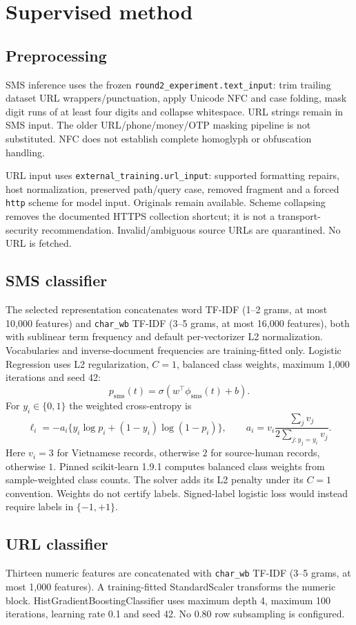 \documentclass[11pt]{article}
\begin{document}
\section{Supervised method}
\subsection{Preprocessing}
SMS inference uses the frozen \texttt{round2\_experiment.text\_input}: trim
trailing dataset URL wrappers/punctuation, apply Unicode NFC and case folding,
mask digit runs of at least four digits and collapse whitespace. URL strings remain
in SMS input. The older URL/phone/money/OTP masking pipeline is not substituted.
NFC does not establish complete homoglyph or obfuscation handling.

URL input uses \texttt{external\_training.url\_input}: supported formatting repairs,
host normalization, preserved path/query case, removed fragment and a forced
\texttt{http} scheme for model input. Originals remain available. Scheme collapsing
removes the documented HTTPS collection shortcut; it is not a transport-security
recommendation. Invalid/ambiguous source URLs are quarantined. No URL is fetched.

\subsection{SMS classifier}
The selected representation concatenates word TF-IDF (1--2 grams, at most 10,000
features) and \texttt{char\_wb} TF-IDF (3--5 grams, at most 16,000 features), both
with sublinear term frequency and default per-vectorizer L2 normalization.
Vocabularies and inverse-document frequencies are training-fitted only.
Logistic Regression uses L2 regularization, $C=1$, balanced class weights,
maximum 1,000 iterations and seed 42:
\[
p_{\mathrm{sms}}(t)=\sigma(w^\top\phi_{\mathrm{sms}}(t)+b).
\]
For $y_i\in\{0,1\}$ the weighted cross-entropy is
\[
\ell_i=-a_i\{y_i\log p_i+(1-y_i)\log(1-p_i)\},\qquad
 a_i=v_i\frac{\sum_j v_j}{2\sum_{j:y_j=y_i}v_j}.
\]
Here $v_i=3$ for Vietnamese records, otherwise $2$ for source-human records,
otherwise $1$. Pinned scikit-learn 1.9.1 computes balanced class weights from
sample-weighted class counts. The solver adds its L2 penalty under its $C=1$
convention. Weights do not certify labels. Signed-label logistic loss would instead
require labels in $\{-1,+1\}$.

\subsection{URL classifier}
Thirteen numeric features are concatenated with \texttt{char\_wb} TF-IDF (3--5
grams, at most 1,000 features). A training-fitted StandardScaler transforms the
numeric block. HistGradientBoostingClassifier uses maximum depth 4, maximum
100 iterations, learning rate 0.1 and seed 42. No 0.80 row subsampling is configured.
\end{document}
